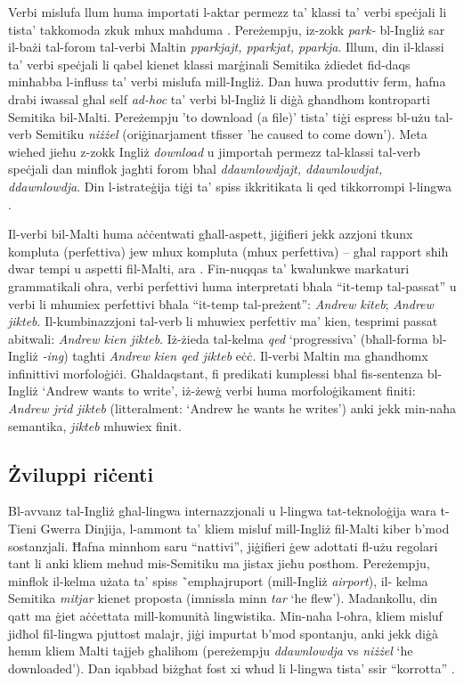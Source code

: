 \begin{multicols}{2}
Verbi mislufa llum huma importati l-aktar permezz ta’ klassi ta’ verbi speċjali li tista’ takkomoda zkuk mhux maħduma \cite{Mifsud:1995}. Pereżempju, iz-zokk \emph{park-} bl-Ingliż sar il-bażi tal-forom tal-verbi Maltin \emph{pparkjajt, pparkjat, pparkja}. Illum, din il-klassi ta’ verbi speċjali li qabel kienet klassi marġinali Semitika żdiedet fid-daqs minħabba l-influss ta’ verbi mislufa mill-Ingliż. Dan huwa produttiv ferm, ħafna drabi iwassal għal self \emph{ad-hoc} ta’ verbi bl-Ingliż li diġà għandhom kontroparti Semitika bil-Malti. Pereżempju 'to download (a file)' tista’ tiġi espress bl-użu tal-verb Semitiku \emph{niżżel} (oriġinarjament tfisser 'he caused to come down'). Meta wieħed jieħu z-zokk Ingliż \emph{download} u  jimportah permezz tal-klassi tal-verb speċjali dan minflok jagħti forom bħal \emph{ddawnlowdjajt, ddawnlowdjat, ddawnlowdja}. Din l-istrateġija tiġi ta’ spiss ikkritikata li qed tikkorrompi l-lingwa \cite{Fabri:2011a}.


Il-verbi bil-Malti huma aċċentwati għall-aspett, jiġifieri jekk azzjoni tkunx kompluta (perfettiva) jew mhux kompluta (mhux perfettiva) -- għal rapport sħiħ dwar tempi u aspetti fil-Malti, ara \cite{Fabri:1995,Ebert:2000}. Fin-nuqqas ta’ kwalunkwe markaturi grammatikali oħra, verbi perfettivi huma interpretati bħala ``it-temp tal-passat'' u verbi li mhumiex perfettivi bħala ``it-temp tal-preżent'': \emph{Andrew kiteb}; \emph{Andrew jikteb}. Il-kumbinazzjoni tal-verb li mhuwiex perfettiv ma’ kien, tesprimi passat abitwali: \emph{Andrew kien jikteb}. Iż-żieda tal-kelma \emph{qed} `progressiva' (bħall-forma bl-Ingliż \emph{-ing}) tagħti \emph{Andrew kien qed jikteb} eċċ.
Il-verbi Maltin ma għandhomx infinittivi morfoloġiċi. Għaldaqstant, fi predikati kumplessi bħal fis-sentenza bl-Ingliż `Andrew wants to write', iż-żewġ verbi huma morfoloġikament finiti: \emph{Andrew jrid jikteb} (litteralment: `Andrew he wants he writes') anki jekk min-naħa semantika, \emph{jikteb} mhuwiex finit.

\subsection{Żviluppi riċenti}

Bl-avvanz tal-Ingliż għal-lingwa internazzjonali u l-lingwa tat-teknoloġija wara t-Tieni Gwerra Dinjija, l-ammont ta’ kliem misluf mill-Ingliż fil-Malti kiber b’mod sostanzjali. Ħafna minnhom saru ``nattivi'', jiġifieri ġew adottati fl-użu regolari tant li anki kliem meħud mis-Semitiku ma jistax jieħu posthom. Pereżempju, minflok il-kelma użata ta’ spiss ˜emph{ajruport} (mill-Ingliż \emph{airport}), il- kelma Semitika \emph{mitjar} kienet proposta (imnissla minn \emph{tar} `he flew'). Madankollu, din qatt ma ġiet aċċettata mill-komunità lingwistika. Min-naħa l-oħra, kliem misluf jidħol fil-lingwa pjuttost malajr, jiġi impurtat b’mod spontanju, anki jekk diġà hemm kliem Malti tajjeb għalihom (pereżempju \emph{ddawnlowdja} vs \emph{niżżel} `he downloaded'). Dan iqabbad biżgħat fost xi wħud li l-lingwa tista’ ssir ``korrotta'' \cite{Fabri:2011a}.


\end{multicols}
